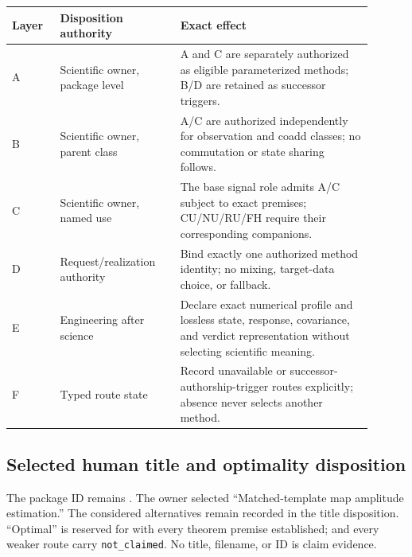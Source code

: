 \documentclass[11pt]{article}
\begin{document}
\begin{longtable}{p{0.12\linewidth}p{0.30\linewidth}p{0.48\linewidth}}
\toprule
Layer & Disposition authority & Exact effect \\
\midrule
\endhead
A & Scientific owner, package level & A and C are separately authorized as
eligible parameterized methods; B/D are retained as successor triggers. \\
B & Scientific owner, parent class & A/C are authorized independently for
observation and coadd classes; no commutation or state sharing follows. \\
C & Scientific owner, named use & The base signal role admits A/C subject to
exact premises; CU/NU/RU/FH require their corresponding companions. \\
D & Request/realization authority & Bind exactly one authorized method identity;
no mixing, target-data choice, or fallback. \\
E & Engineering after science & Declare exact numerical profile and lossless
state, response, covariance, and verdict representation without selecting
scientific meaning. \\
F & Typed route state & Record unavailable or successor-authorship-trigger
routes explicitly; absence never selects another method. \\
\bottomrule
\end{longtable}

\subsection{Selected human title and optimality disposition}

The package ID remains \ContractID{}. The owner selected
``Matched-template map amplitude estimation.'' The considered alternatives
remain recorded in the title disposition. ``Optimal'' is reserved for
 with every theorem premise established;  and every
weaker route carry \texttt{not\_claimed}. No title, filename, or ID is claim
evidence.
\end{document}
